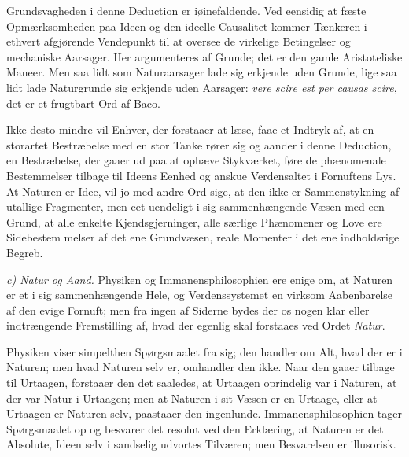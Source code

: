 \documentclass[12pt,a4paper]{book}
\newcommand{\runin}[1]{\emph{#1}\hspace{0.4em}}
\begin{document}
Grundsvagheden i denne Deduction er iøinefaldende. Ved eensidig at fæste
Opmærksomheden paa Ideen og den ideelle Causalitet kommer Tænkeren i ethvert
afgjørende Vendepunkt til at oversee de virkelige Betingelser og mechaniske
Aarsager. Her argumenteres af Grunde; det er den gamle Aristoteliske Maneer.
Men saa lidt som Naturaarsager lade sig erkjende uden Grunde, lige saa lidt
lade Naturgrunde sig erkjende uden Aarsager: \textit{vere scire est per causas
scire}, det er et frugtbart Ord af Baco.

Ikke desto mindre vil Enhver, der forstaaer at læse, faae et Indtryk af, at en
storartet Bestræbelse med en stor Tanke rører sig og aander i denne Deduction,
en Bestræbelse, der gaaer ud paa at ophæve Stykværket, føre de phænomenale
Bestemmelser tilbage til Ideens Eenhed og anskue Verdensaltet i Fornuftens Lys.
At Naturen er Idee, vil jo med andre Ord sige, at den ikke er Sammenstykning af
utallige Fragmenter, men eet uendeligt i sig sammenhængende Væsen med een
Grund, at alle enkelte Kjendsgjerninger, alle særlige Phænomener og Love ere
Sidebestem\-%
melser af det ene Grundvæsen, reale Momenter i det ene indholdsrige Begreb.

\runin{c) Natur og Aand.} Physiken og Immanensphilosophien ere enige om, at
Naturen er et i sig sammenhængende Hele, og Verdenssystemet en virksom
Aabenbarelse af den evige Fornuft; men fra ingen af Siderne bydes der os nogen
klar eller indtrængende Fremstilling af, hvad der egenlig skal forstaaes ved
Ordet \emph{Natur}.

Physiken viser simpelthen Spørgsmaalet fra sig; den handler om Alt, hvad der er
i Naturen; men hvad Naturen selv er, omhandler den ikke. Naar den gaaer tilbage
til Urtaagen, forstaaer den det saaledes, at Urtaagen oprindelig var i Naturen,
at der var Natur i Urtaagen; men at Naturen i sit Væsen er en Urtaage, eller at
Urtaagen er Naturen selv, paastaaer den ingenlunde. Immanensphilosophien tager
Spørgsmaalet op og besvarer det resolut ved den Erklæring, at Naturen er det
Absolute, Ideen selv i sandselig udvortes Tilværen; men Besvarelsen er
illusorisk.
\end{document}
